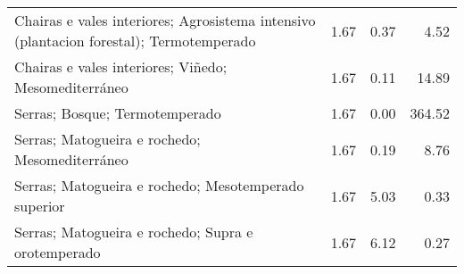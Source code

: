 \begin{table}[p]
\begin{tabular}{lrrr}
  Chairas e vales interiores; Agrosistema intensivo (plantacion forestal); Termotemperado & 1.67 & 0.37 & 4.52 \\ 
  Chairas e vales interiores; Viñedo; Mesomediterráneo & 1.67 & 0.11 & 14.89 \\ 
  Serras; Bosque; Termotemperado & 1.67 & 0.00 & 364.52 \\ 
  Serras; Matogueira e rochedo; Mesomediterráneo & 1.67 & 0.19 & 8.76 \\ 
  Serras; Matogueira e rochedo; Mesotemperado superior & 1.67 & 5.03 & 0.33 \\ 
  Serras; Matogueira e rochedo; Supra e orotemperado & 1.67 & 6.12 & 0.27 \\ 
   \hline
\end{tabular}
\end{table}
